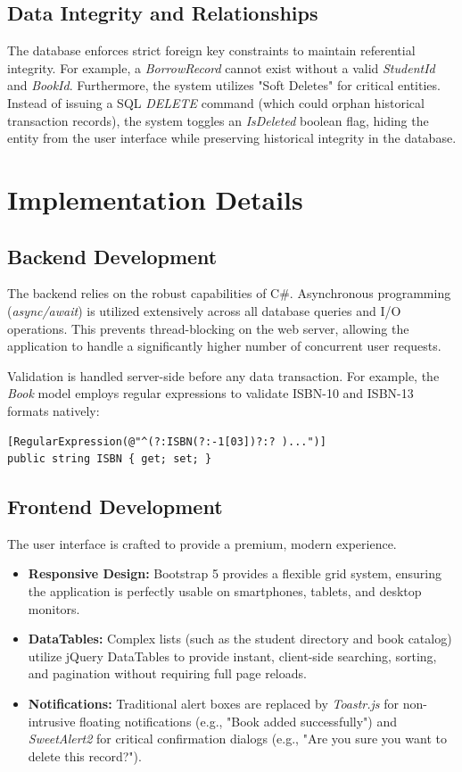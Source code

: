 \documentclass[conference]{IEEEtran}
\begin{document}
\subsection{Data Integrity and Relationships}
The database enforces strict foreign key constraints to maintain referential integrity. For example, a \textit{BorrowRecord} cannot exist without a valid \textit{StudentId} and \textit{BookId}. Furthermore, the system utilizes "Soft Deletes" for critical entities. Instead of issuing a SQL \textit{DELETE} command (which could orphan historical transaction records), the system toggles an \textit{IsDeleted} boolean flag, hiding the entity from the user interface while preserving historical integrity in the database.

\section{Implementation Details}

\subsection{Backend Development}
The backend relies on the robust capabilities of C\#. Asynchronous programming (\textit{async/await}) is utilized extensively across all database queries and I/O operations. This prevents thread-blocking on the web server, allowing the application to handle a significantly higher number of concurrent user requests.

Validation is handled server-side before any data transaction. For example, the \textit{Book} model employs regular expressions to validate ISBN-10 and ISBN-13 formats natively:
\begin{verbatim}
[RegularExpression(@"^(?:ISBN(?:-1[03])?:? )...")]
public string ISBN { get; set; }
\end{verbatim}

\subsection{Frontend Development}
The user interface is crafted to provide a premium, modern experience. 
\begin{itemize}
    \item \textbf{Responsive Design:} Bootstrap 5 provides a flexible grid system, ensuring the application is perfectly usable on smartphones, tablets, and desktop monitors.
    \item \textbf{DataTables:} Complex lists (such as the student directory and book catalog) utilize jQuery DataTables to provide instant, client-side searching, sorting, and pagination without requiring full page reloads.
    \item \textbf{Notifications:} Traditional alert boxes are replaced by \textit{Toastr.js} for non-intrusive floating notifications (e.g., "Book added successfully") and \textit{SweetAlert2} for critical confirmation dialogs (e.g., "Are you sure you want to delete this record?").
\end{itemize}
\end{document}

